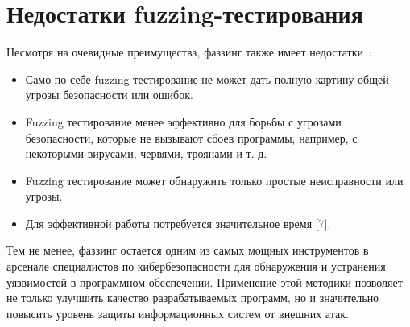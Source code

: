 \section{Недостатки fuzzing-тестирования} \label{ch1:sec2} 
Несмотря на очевидные преимущества, фаззинг также имеет недостатки~\cite{???}:
\begin{itemize}
	\item Само по себе fuzzing тестирование не может дать полную картину общей угрозы безопасности или ошибок.
	\item Fuzzing тестирование менее эффективно для борьбы с угрозами безопасности, которые не вызывают сбоев программы, например, с некоторыми вирусами, червями, троянами и т. д.
	\item Fuzzing тестирование может обнаружить только простые неисправности или угрозы.
	\item Для эффективной работы потребуется значительное время [7].
\end{itemize}
\par
 Тем не менее, фаззинг остается одним из самых мощных инструментов в арсенале специалистов по кибербезопасности для обнаружения и устранения уязвимостей в программном обеспечении. Применение этой методики позволяет не только улучшить качество разрабатываемых программ, но и значительно повысить уровень защиты информационных систем от внешних атак.
 
